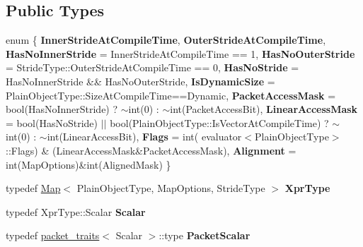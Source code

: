 \subsection*{Public Types}
\begin{DoxyCompactItemize}
\item 
\mbox{\label{struct_eigen_1_1internal_1_1evaluator_3_01_map_3_01_plain_object_type_00_01_map_options_00_01_stride_type_01_4_01_4_a0afd560816358ba731b05efc02d9a801}} 
enum \{ \newline
{\bfseries Inner\+Stride\+At\+Compile\+Time}, 
{\bfseries Outer\+Stride\+At\+Compile\+Time}, 
{\bfseries Has\+No\+Inner\+Stride} = Inner\+Stride\+At\+Compile\+Time == 1, 
{\bfseries Has\+No\+Outer\+Stride} = Stride\+Type\+::Outer\+Stride\+At\+Compile\+Time == 0, 
\newline
{\bfseries Has\+No\+Stride} = Has\+No\+Inner\+Stride \&\& Has\+No\+Outer\+Stride, 
{\bfseries Is\+Dynamic\+Size} = Plain\+Object\+Type\+::Size\+At\+Compile\+Time==Dynamic, 
{\bfseries Packet\+Access\+Mask} = bool(Has\+No\+Inner\+Stride) ? $\sim$int(0) \+: $\sim$int(Packet\+Access\+Bit), 
{\bfseries Linear\+Access\+Mask} = bool(Has\+No\+Stride) $\vert$$\vert$ bool(Plain\+Object\+Type\+::Is\+Vector\+At\+Compile\+Time) ? $\sim$int(0) \+: $\sim$int(Linear\+Access\+Bit), 
\newline
{\bfseries Flags} = int( evaluator$<$Plain\+Object\+Type$>$\+::Flags) \& (Linear\+Access\+Mask\&Packet\+Access\+Mask), 
{\bfseries Alignment} = int(Map\+Options)\&int(Aligned\+Mask)
 \}
\item 
\mbox{\label{struct_eigen_1_1internal_1_1evaluator_3_01_map_3_01_plain_object_type_00_01_map_options_00_01_stride_type_01_4_01_4_a80fdb5638d909afe0fd082f96bde0e1b}} 
typedef \mbox{\hyperlink{class_eigen_1_1_map}{Map}}$<$ Plain\+Object\+Type, Map\+Options, Stride\+Type $>$ {\bfseries Xpr\+Type}
\item 
\mbox{\label{struct_eigen_1_1internal_1_1evaluator_3_01_map_3_01_plain_object_type_00_01_map_options_00_01_stride_type_01_4_01_4_a4c72be1590c93d2fddf24398a45d9f7b}} 
typedef Xpr\+Type\+::\+Scalar {\bfseries Scalar}
\item 
\mbox{\label{struct_eigen_1_1internal_1_1evaluator_3_01_map_3_01_plain_object_type_00_01_map_options_00_01_stride_type_01_4_01_4_a005617b21f80a25250a573052bd35319}} 
typedef \mbox{\hyperlink{struct_eigen_1_1internal_1_1packet__traits}{packet\+\_\+traits}}$<$ Scalar $>$\+::type {\bfseries Packet\+Scalar}
\end{DoxyCompactItemize}
